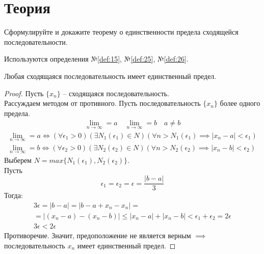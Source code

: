 \section{Теория}


\begin{question}
    Сформулируйте и докажите теорему о единственности предела сходящейся последовательности.
\end{question}
\begin{used}
    Используются определения №\ref{def:15}, №\ref{def:25}, №\ref{def:26}.
\end{used}
\begin{theorem}
    Любая сходящаяся последовательность имеет единственный предел.
\end{theorem}
\begin{proof}
    Пусть $\{x_{n}\} $ -- сходящаяся последовательность. \\
    Рассуждаем методом от противного. Пусть последовательность $\{x_{n}\} $ более одного предела.
    \begin{gather*}
        \lim_{n \to \infty} = a \quad
        \lim_{n \to \infty} = b \quad 
        a \neq b
    \end{gather*}
    \begin{gather}
        \lim_{n \to \infty} = a \iff (\forall \epsilon_1 > 0)(\exists N_1(\epsilon_1) \in N)(\forall n > N_1(\epsilon_1) \implies |x_{n} - a| < \epsilon_1) \\
        \lim_{n \to \infty} = b \iff (\forall \epsilon_2 > 0)(\exists N_2(\epsilon_2) \in N)(\forall n > N_2(\epsilon_2) \implies |x_{n} - b| < \epsilon_2)  
    \end{gather} 
    Выберем $N=max \{N_1\left( \epsilon_1 \right) , N_2\left( \epsilon_2 \right) \}$. \\
    Пусть \[
        \epsilon_1 = \epsilon_2 = \epsilon = \frac{|b - a|}{3}
    \]
    Тогда:
    \begin{gather*}
        3 \epsilon = |b - a| = |b - a + x_{n} - x_{n}| = \\
        = |(x_{n} - a) - (x_{n} - b)| \le |x_{n} - a| + |x_{n} - b| < \epsilon_1 + \epsilon_2 = 2 \epsilon \\
        3 \epsilon < 2 \epsilon
    \end{gather*}
    Противоречие. Значит, предоположение не является верным $\implies$ последовательность $x_{n}$ имеет единственный предел.
\end{proof}
\pagebreak


